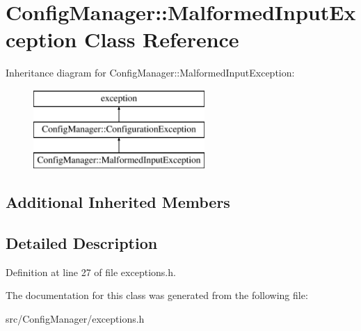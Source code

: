 \hypertarget{class_config_manager_1_1_malformed_input_exception}{}\section{Config\+Manager\+:\+:Malformed\+Input\+Exception Class Reference}
\label{class_config_manager_1_1_malformed_input_exception}
Inheritance diagram for Config\+Manager\+:\+:Malformed\+Input\+Exception\+:\begin{figure}[H]
\begin{center}
\leavevmode
\includegraphics[height=3.000000cm]{class_config_manager_1_1_malformed_input_exception}
\end{center}
\end{figure}
\subsection*{Additional Inherited Members}


\subsection{Detailed Description}


Definition at line 27 of file exceptions.\+h.



The documentation for this class was generated from the following file\+:\begin{DoxyCompactItemize}
\item 
src/\+Config\+Manager/exceptions.\+h\end{DoxyCompactItemize}
